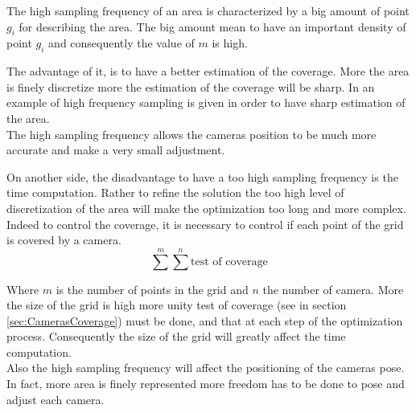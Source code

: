 The high sampling frequency of an area is characterized by a big amount of point $g_i$ for describing the area. The big amount mean to have an important density of point $g_i$ and consequently the value of $m$ is high. 

%
The advantage of it, is to have a better estimation of the coverage. More the area is finely discretize more the estimation of the coverage will be sharp. In \citep{171*horster2006} an example of high frequency sampling is given in order to have sharp estimation of the area. \\
The high sampling frequency allows the cameras position to be much more accurate and make a very small adjustment.


On another side, the disadvantage to have a too high sampling frequency is the time computation. Rather to refine the solution the too high level of discretization of the area will make the optimization too long and more complex. Indeed to control the coverage, it is necessary to control if each point of the grid is covered by a camera.  
\begin{equation} 
	\sum^m \sum^n \mbox{test of coverage}
\end{equation}

Where $m$ is the number of points in the grid and $n$ the number of camera. 
 More the size of the grid is high more unity test of coverage (see in section \ref{sec:CamerasCoverage}) must be done, and that at each step of the optimization process.  Consequently the size of the grid will greatly affect the time computation.  \\
Also the high sampling frequency will affect the positioning of the cameras pose. In fact, more area is finely represented more freedom has to be done to pose and adjust each camera. 



